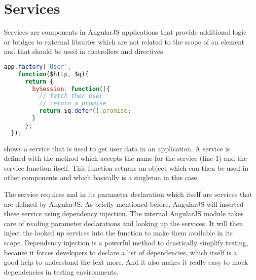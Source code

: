 \section{Services}
\label{sect:services}

Services are components in AngularJS applications that provide additional logic or bridges to external libraries which are not related to the scope of an element and that should be used in controllers and directives.

\begin{lstlisting}[language=JavaScript, caption=A simple AngularJS service, label=lst:angular-service]
  app.factory('User',
    function($http, $q){
      return {
        bySession: function(){
          // fetch ther user
          // return a promise
          return $q.defer().promise;
        }
      };
  });
\end{lstlisting}

 shows a  service that is used to get user data in an application. A service is defined with the  method which accepts the name for the service (line 1) and the service function itself. This function returns an object which can then be used in other components and which basically is a singleton in this case. 

The service requires  and  in its parameter declaration which itself are services that are defined by AngularJS. As briefly mentioned before, AngularJS will inserted these service using dependency injection. The internal AngularJS module  takes care of reading parameter declarations and looking up the services. It will then inject the looked up services into the function to make them available in its scope. Dependency injection is a powerful method to drastically simplify testing, because it forces developers to declare a list of dependencies, which itself is a good help to understand the text more. And it also makes it really easy to mock dependencies in testing environments.

